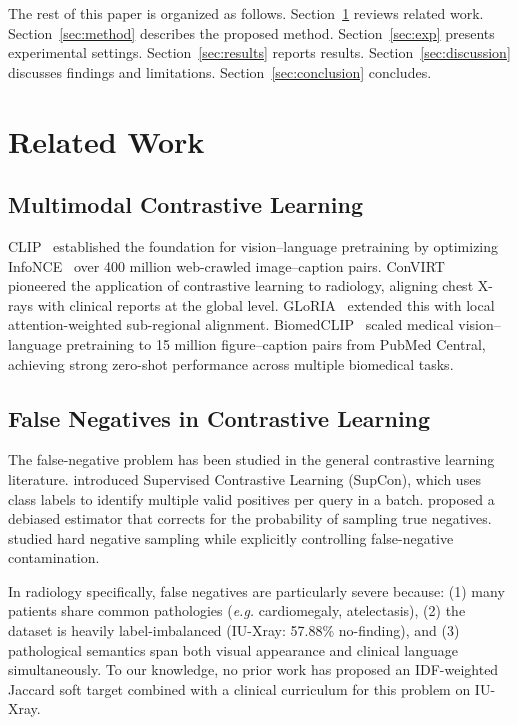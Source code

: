 \documentclass[11pt, a4paper]{article}
\newcommand{\eg}{\textit{e.g.}}
\begin{document}
The rest of this paper is organized as follows.
Section~\ref{sec:related} reviews related work.
Section~\ref{sec:method} describes the proposed method.
Section~\ref{sec:exp} presents experimental settings.
Section~\ref{sec:results} reports results.
Section~\ref{sec:discussion} discusses findings and limitations.
Section~\ref{sec:conclusion} concludes.

\section{Related Work}
\label{sec:related}

\subsection{Multimodal Contrastive Learning}

CLIP~\citep{radford2021learning} established the foundation for
vision--language pretraining by optimizing InfoNCE~\citep{oord2018representation}
over 400 million web-crawled image--caption pairs.
ConVIRT~\citep{zhang2022contrastive} pioneered the application of contrastive
learning to radiology, aligning chest X-rays with clinical reports at the
global level.
GLoRIA~\citep{huang2021gloria} extended this with local attention-weighted
sub-regional alignment.
BiomedCLIP~\citep{zhang2023biomedclip} scaled medical vision--language
pretraining to 15 million figure--caption pairs from PubMed Central,
achieving strong zero-shot performance across multiple biomedical tasks.

\subsection{False Negatives in Contrastive Learning}

The false-negative problem has been studied in the general contrastive
learning literature.
\citet{khosla2020supervised} introduced Supervised Contrastive Learning
(SupCon), which uses class labels to identify multiple valid positives per
query in a batch.
\citet{chuang2020debiased} proposed a debiased estimator that corrects for
the probability of sampling true negatives.
\citet{robinson2021contrastive} studied hard negative sampling while
explicitly controlling false-negative contamination.

In radiology specifically, false negatives are particularly severe because:
(1) many patients share common pathologies (\eg{} cardiomegaly, atelectasis),
(2) the dataset is heavily label-imbalanced (IU-Xray: 57.88\% no-finding),
and (3) pathological semantics span both visual appearance and clinical
language simultaneously.
To our knowledge, no prior work has proposed an IDF-weighted Jaccard soft
target combined with a clinical curriculum for this problem on IU-Xray.
\end{document}
